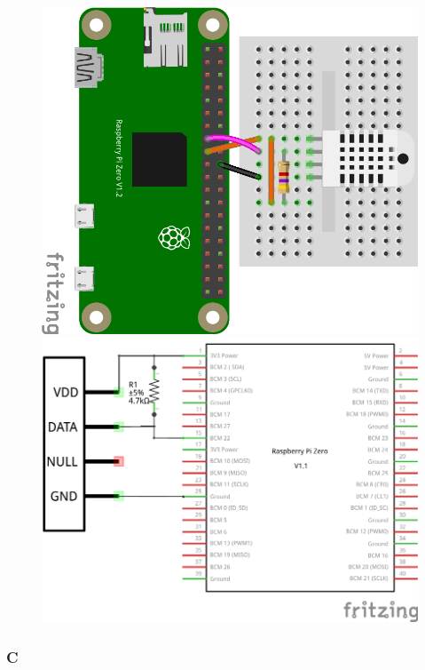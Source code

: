 
\begin{figure}[ht]
  \centering
  \includegraphics[scale=0.24]{images/DHT22_Steckplatine.png}	
  \includegraphics[scale=0.25]{images/DHT22_Schaltplan.png}	
  \label{DHT22_Steckplatine}
\end{figure}



\subsubsection{C}

